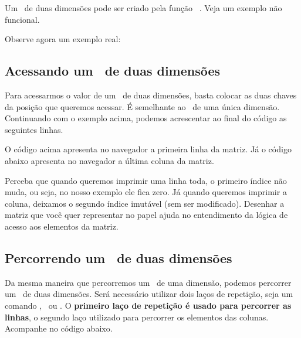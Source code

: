 
Um \tipoarray~de duas dimensões pode ser criado pela função \comandoarray~. Veja um exemplo
não funcional.



Observe agora um exemplo real:



\subsection{Acessando um \tipoarray~de duas dimensões}
\label{acessando-um-array-de-duas-dimensoes}

Para acessarmos o valor de um \tipoarray~de duas dimensões, basta colocar as 
duas chaves da posição que queremos acessar. É semelhante ao \tipoarray~de uma única dimensão.
Continuando com o exemplo acima, podemos acrescentar ao final do código as seguintes linhas.



O código acima apresenta no navegador a primeira linha da matriz. Já o código abaixo
apresenta no navegador a última coluna da matriz.



Perceba que quando queremos imprimir uma linha toda, o primeiro índice não muda, ou seja,
no nosso exemplo ele fica zero. Já quando queremos imprimir a coluna, deixamos o segundo
índice imutável (sem ser modificado). Desenhar a matriz que você quer representar no papel 
ajuda no entendimento da lógica de acesso aos elementos da matriz.

\subsection{Percorrendo um \tipoarray~de duas dimensões}
\label{percorrendo-um-array-de-duas-dimensoes}

Da mesma maneira que percorremos um \tipoarray~de uma dimensão, podemos percorrer um 
\tipoarray~de duas dimensões. Será necessário utilizar dois laços de repetição, seja
um comando \comandofor, \comandowhile~ou \comandoforeach. O \textbf{primeiro laço de repetição
é usado para percorrer as linhas}, o segundo laço utilizado para percorrer os elementos
das colunas. Acompanhe no código abaixo.

